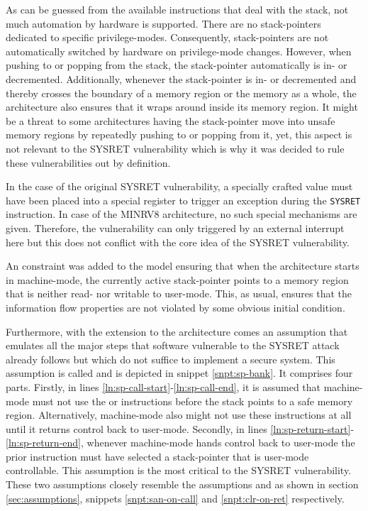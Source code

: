 As can be guessed from the available instructions that deal with the stack, not much automation by hardware is supported.
There are no stack-pointers dedicated to specific privilege-modes.
Consequently, stack-pointers are not automatically switched by hardware on privilege-mode changes.
However, when pushing to or popping from the stack, the stack-pointer automatically is in- or decremented.
Additionally, whenever the stack-pointer is in- or decremented and thereby crosses the boundary of a memory region or the memory as a whole, the architecture also ensures that it wraps around inside its memory region.
It might be a threat to some architectures having the stack-pointer move into unsafe memory regions by repeatedly pushing to or popping from it, yet, this aspect is not relevant to the SYSRET vulnerability which is why it was decided to rule these vulnerabilities out by definition.

In the case of the original SYSRET vulnerability, a specially crafted value must have been placed into a special register to trigger an exception during the \lstinline{SYSRET} instruction.
In case of the MINRV8 architecture, no such special mechanisms are given.
Therefore, the vulnerability can only triggered by an external interrupt here but this does not conflict with the core idea of the SYSRET vulnerability.

An  constraint was added to the model ensuring that when the architecture starts in machine-mode, the currently active stack-pointer points to a memory region that is neither read- nor writable to user-mode.
This, as usual, ensures that the information flow properties are not violated by some obvious initial condition.

Furthermore, with the extension to the architecture comes an assumption that emulates all the major steps that software vulnerable to the SYSRET attack already follows but which do not suffice to implement a secure system.
This assumption is called  and is depicted in snippet \ref{snpt:sp-bank}.
It comprises four parts.
Firstly, in lines \ref{ln:sp-call-start}-\ref{ln:sp-call-end}, it is assumed that machine-mode must not use the  or  instructions before the stack points to a safe memory region.
Alternatively, machine-mode also might not use these instructions at all until it returns control back to user-mode.
Secondly, in lines \ref{ln:sp-return-start}-\ref{ln:sp-return-end}, whenever machine-mode hands control back to user-mode the prior instruction must have selected a stack-pointer that is user-mode controllable.
This assumption is the most critical to the SYSRET vulnerability.
These two assumptions closely resemble the assumptions  and  as shown in section \ref{sec:assumptions}, snippets \ref{snpt:san-on-call} and \ref{snpt:clr-on-ret} respectively.

